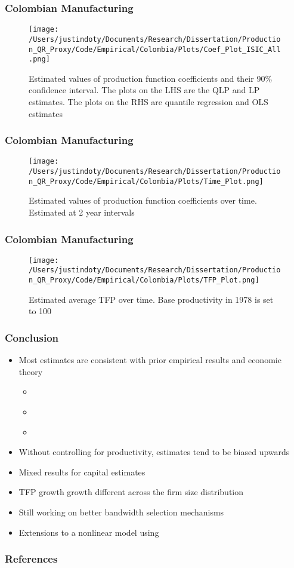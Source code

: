 \documentclass{beamer}
\begin{document}
\begin{frame}
\frametitle{Colombian Manufacturing}
\begin{figure}[ht]
\centering
\texttt{[image: /Users/justindoty/Documents/Research/Dissertation/Production\_QR\_Proxy/Code/Empirical/Colombia/Plots/Coef\_Plot\_ISIC\_All.png]}
\caption{Estimated values of production function coefficients and their 90\% confidence interval. The plots on the LHS are the QLP and LP estimates. The plots on the RHS are quantile regression and OLS estimates}
\end{figure}
\end{frame}

\begin{frame}
\frametitle{Colombian Manufacturing}
\begin{figure}[ht]
\centering
\texttt{[image: /Users/justindoty/Documents/Research/Dissertation/Production\_QR\_Proxy/Code/Empirical/Colombia/Plots/Time\_Plot.png]}
\caption{Estimated values of production function coefficients over time. Estimated at 2 year intervals}
\end{figure}
\end{frame}

\begin{frame}
\frametitle{Colombian Manufacturing}
\begin{figure}[ht]
\centering
\texttt{[image: /Users/justindoty/Documents/Research/Dissertation/Production\_QR\_Proxy/Code/Empirical/Colombia/Plots/TFP\_Plot.png]}
\caption{Estimated average TFP over time. Base productivity in 1978 is set to 100}
\end{figure}
\end{frame}

\begin{frame}
\frametitle{Conclusion}
\begin{itemize}
	\item Most estimates are consistent with prior empirical results and economic theory
		\begin{itemize}
			\item \textcite{mert}
			\item \textcite{Holmes2008}
			\item \textcite{Rajan1999}
		\end{itemize}
	\item Without controlling for productivity, estimates tend to be biased upwards
	\item Mixed results for capital estimates
	\item TFP growth growth different across the firm size distribution
	\item Still working on better bandwidth selection mechanisms
	\item Extensions to a nonlinear model using \textcite{Arellano2016}
\end{itemize}{}
\end{frame}

\begin{frame}[allowframebreaks]
\frametitle{References}
\AtNextBibliography{\small}
\printbibliography
\end{frame}
\end{document}
